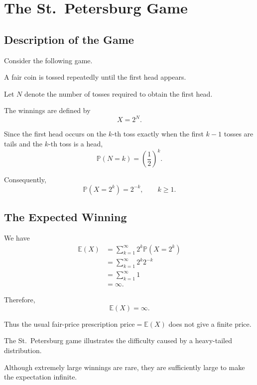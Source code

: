 
\section{The St.\ Petersburg Game}

\subsection{Description of the Game}

Consider the following game.

A fair coin is tossed repeatedly until the first head appears.

Let
\(
N
\)
denote the number of tosses required to obtain the first head.

The winnings are defined by
\[
X=2^N.
\]

Since the first head occurs on the $k$-th toss exactly when the first
$k-1$ tosses are tails and the $k$-th toss is a head,
\[
\mathbb{P}(N=k)
=
\left(\frac12\right)^k.
\]

Consequently,
\[
\boxed{
\mathbb{P}(X=2^k)=2^{-k},
\qquad k\geq1.
}
\]

\subsection{The Expected Winning}

We have
\[
\begin{aligned}
\mathbb{E}(X)
&=
\sum_{k=1}^{\infty}
2^k\mathbb{P}(X=2^k)\\
&=
\sum_{k=1}^{\infty}
2^k2^{-k}\\
&=
\sum_{k=1}^{\infty}1\\
&=\infty.
\end{aligned}
\]

Therefore,
\[
\boxed{
\mathbb{E}(X)=\infty.
}
\]

Thus the usual fair-price prescription
\(
\text{price}=\mathbb{E}(X)
\)
does not give a finite price.

\begin{observation}

The St.\ Petersburg game illustrates the difficulty caused by a
heavy-tailed distribution.

Although extremely large winnings are rare, they are sufficiently
large to make the expectation infinite.

\end{observation}


